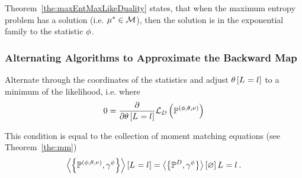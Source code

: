 %
Theorem~\ref{the:maxEntMaxLikeDuality} states, that when the maximum entropy problem has a solution (i.e. $\mu^*\in\mathcal{M}$), then the solution is in the exponential family to the statistic $\phi$.


\subsubsection{Alternating Algorithms to Approximate the Backward Map}\label{sec:alternatingBackwardMap}




Alternate through the coordinates of the statistics and adjust $\theta\left[L_{}=l_{}\right]$ to a minimum of the likelihood, i.e. where
\begin{align*}
	0 = \frac{\partial}{\partial \theta\left[L_{}=l_{}\right]} \mathcal{L}_{D}\left(\mathbb{P}^{(\phi,\theta,\nu)}\right)
\end{align*}

This condition is equal to the collection of moment matching equations (see Theorem~\ref{the:mm})
\begin{align*}
	\left\langle \left\{\mathbb{P}^{(\phi,\theta,\nu)},\gamma^{\phi}\right\}\right\rangle \left[ L_{}=l_{} \right] = \left\langle \left\{\mathbb{P}^{D},\gamma^{\phi}\right\}\right\rangle \left[ \varnothing \right]{L_{}=l_{}} \, . 
\end{align*}


